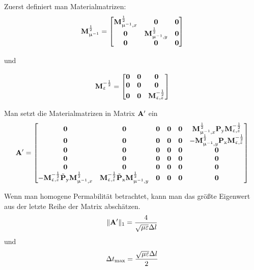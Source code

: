 \documentclass[Protokollheft.tex]{subfiles}
\begin{document}
Zuerst definiert man Materialmatrizen:
$$\mathbf{M}_{\upmu^{-1}}^\frac12 = \begin{bmatrix}
\mathbf{M}^{\frac12}_{\upmu^{-1},x} & \boldsymbol{0} &\boldsymbol{0}\\
\boldsymbol{0} & \mathbf{M}^{\frac12}_{\upmu^{-1},y} & \boldsymbol{0} \\
\boldsymbol{0} & \boldsymbol{0} & \boldsymbol{0}
\end{bmatrix} $$

und

$$\mathbf{M}_{\upvarepsilon}^{-\frac12} = \begin{bmatrix}
\boldsymbol{0} & \boldsymbol{0} & \boldsymbol{0}\\
\boldsymbol{0} & \boldsymbol{0} & \boldsymbol{0}\\
\boldsymbol{0} & \boldsymbol{0} & \mathbf{M}^{-\frac12}_{\upvarepsilon, z}
\end{bmatrix} $$

Man setzt die Materialmatrizen in Matrix $\Amat'$ ein
$$\Amat'= \begin{bmatrix}
\boldsymbol{0} &\boldsymbol{0} &\boldsymbol{0} &\boldsymbol{0} &\boldsymbol{0} & \ensuremath{\mathbf{M}^{\frac12}_{\upmu^{-1},x}}\Pmat_\mathrm{y} \ensuremath{\mathbf{M}^{-\frac12}_{\upvarepsilon, z}}\\
\boldsymbol{0} &\boldsymbol{0} &\boldsymbol{0} &\boldsymbol{0} &\boldsymbol{0} & -\ensuremath{\mathbf{M}^{\frac12}_{\upmu^{-1},y}}\Pmat_\mathrm{x} \ensuremath{\mathbf{M}^{-\frac12}_{\upvarepsilon, z}}\\
\boldsymbol{0} &\boldsymbol{0} &\boldsymbol{0} &\boldsymbol{0} &\boldsymbol{0} & \boldsymbol{0}\\
\boldsymbol{0} &\boldsymbol{0} &\boldsymbol{0} &\boldsymbol{0} &\boldsymbol{0} & \boldsymbol{0}\\
\boldsymbol{0} &\boldsymbol{0} &\boldsymbol{0} &\boldsymbol{0} &\boldsymbol{0} & \boldsymbol{0}\\
-\ensuremath{\mathbf{M}^{-\frac12}_{\upvarepsilon, z}}\tilde{\Pmat}_\mathrm{y}\ensuremath{\mathbf{M}^{\frac12}_{\upmu^{-1},x}} & \ensuremath{\mathbf{M}^{-\frac12}_{\upvarepsilon, z}}\tilde{\Pmat}_\mathrm{x}\ensuremath{\mathbf{M}^{\frac12}_{\upmu^{-1},y}} & \boldsymbol{0} &\boldsymbol{0} &\boldsymbol{0} &\boldsymbol{0}

\end{bmatrix}$$

Wenn man homogene Permabilität betrachtet, kann man das größte Eigenwert aus der letzte Reihe der Matrix abschätzen.
$$\| \mathbf{A} '\|_1 = \frac{4}{\sqrt{\mu\varepsilon}\Delta l}$$
und
$$ \Delta t_{\text{max}}=\frac{\sqrt{\mu\varepsilon}\Delta l}{2}$$
\end{document}
